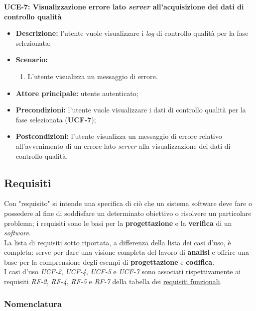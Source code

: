         \textbf{UCE-7: Visualizzazione errore lato \textit{server} all’acquisizione dei dati di controllo qualità}
        \begin{itemize}
            \item \textbf{Descrizione:} l’utente vuole visualizzare i \textit{log} di controllo qualità per la fase selezionata;
            \item \textbf{Scenario:}
                \begin{enumerate}
                    \item L’utente visualizza un messaggio di errore.
                \end{enumerate}
            \item \textbf{Attore principale:} utente autenticato;
            \item \textbf{Precondizioni:} l’utente vuole visualizzare i dati di controllo qualità per la fase selezionata (\textbf{UCF-7});
            \item \textbf{Postcondizioni:} l’utente visualizza un messaggio di errore relativo all’avvenimento di un errore lato \textit{server} alla visualizzazione dei dati di controllo qualità.
        \end{itemize}

\subsection{Requisiti}

Con "requisito" si intende una specifica di ciò che un sistema software deve fare o possedere al fine di soddisfare un determinato obiettivo o risolvere un particolare problema; i requisiti sono le basi per la \textbf{progettazione} e la \textbf{verifica} di un \textit{software}. \\
La lista di requisiti sotto riportata, a differenza della lista dei casi d'uso, è completa: serve per dare una visione completa del lavoro di \textbf{analisi} e offrire una base per la comprensione degli esempi di \textbf{progettazione} e \textbf{codifica}. \\
I casi d'uso \textit{UCF-2}, \textit{UCF-4}, \textit{UCF-5} e \textit{UCF-7} sono associati rispettivamente ai requisiti \textit{RF-2}, \textit{RF-4}, \textit{RF-5} e \textit{RF-7} della tabella dei \hyperref[tab:requisiti-funzionali]{requisiti funzionali}.
\subsubsection*{Nomenclatura}

